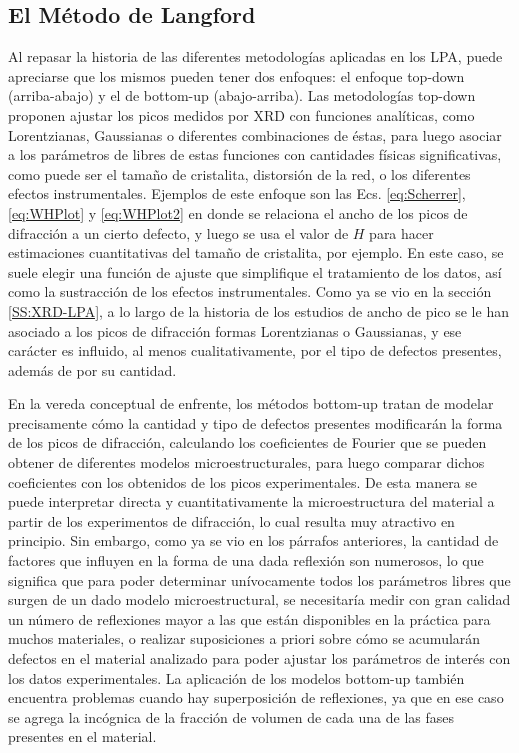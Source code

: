 \subsection{El Método de Langford}\label{SS:Langford}
Al repasar la historia de las diferentes metodologías aplicadas en los LPA, puede apreciarse que los mismos pueden tener dos enfoques: el enfoque top-down (arriba-abajo) y el de bottom-up (abajo-arriba).
Las metodologías top-down proponen ajustar los picos medidos por XRD con funciones analíticas, como Lorentzianas, Gaussianas o diferentes combinaciones de éstas, para luego asociar a los parámetros de libres de estas funciones con cantidades físicas significativas, como puede ser el tamaño de cristalita, distorsión de la red, o los diferentes efectos instrumentales.
Ejemplos de este enfoque son las Ecs. \ref{eq:Scherrer}, \ref{eq:WHPlot} y \ref{eq:WHPlot2} en donde se relaciona el ancho de los picos de difracción a un cierto defecto, y luego se usa el valor de $H$ para hacer estimaciones cuantitativas del tamaño de cristalita, por ejemplo.
En este caso, se suele elegir una función de ajuste que simplifique el tratamiento de los datos, así como la sustracción de los efectos instrumentales.
Como ya se vio en la sección \ref{SS:XRD-LPA}, a lo largo de la historia de los estudios de ancho de pico se le han asociado a los picos de difracción formas Lorentzianas o Gaussianas, y ese carácter es influido, al menos cualitativamente, por el tipo de defectos presentes, además de por su cantidad.

En la vereda conceptual de enfrente, los métodos bottom-up tratan de modelar precisamente cómo la cantidad y tipo de defectos presentes modificarán la forma de los picos de difracción, calculando los coeficientes de Fourier que se pueden obtener de diferentes modelos microestructurales, para luego comparar dichos coeficientes con los obtenidos de los picos experimentales.
De esta manera se puede interpretar directa y cuantitativamente la microestructura del material a partir de los experimentos de difracción, lo cual resulta muy atractivo en principio.
Sin embargo, como ya se vio en los párrafos anteriores, la cantidad de factores que influyen en la forma de una dada reflexión son numerosos, lo que significa que para poder determinar unívocamente todos los parámetros libres que surgen de un dado modelo microestructural, se necesitaría medir con gran calidad un número de reflexiones mayor a las que están disponibles en la práctica para muchos materiales, o realizar suposiciones a priori sobre cómo se acumularán defectos en el material analizado para poder ajustar los parámetros de interés con los datos experimentales.
La aplicación de los modelos bottom-up también encuentra problemas cuando hay superposición de reflexiones, ya que en ese caso se agrega la incógnica de la fracción de volumen de cada una de las fases presentes en el material.


